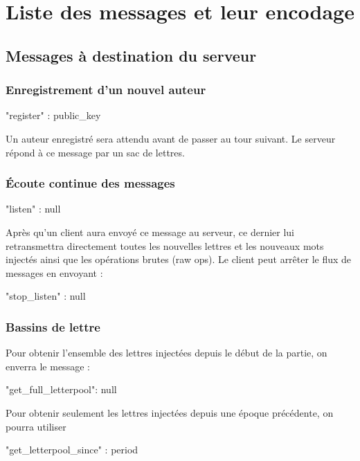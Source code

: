 \documentclass{article}
\begin{document}
\section{Liste des messages et leur encodage}
\label{sec:liste-des-messages}

\subsection{Messages à destination du serveur}
\label{sec:mess-vers-serv}

\subsubsection{Enregistrement d'un nouvel auteur}
\label{sec:register}

\begin{jsonMessage}
  { "register" : public_key }
\end{jsonMessage}
Un auteur enregistré sera attendu avant de passer au tour suivant. Le
serveur répond à ce message par un sac de lettres.

\subsubsection{Écoute continue des messages}
\label{sec:ecoute-continue}
\begin{jsonMessage}
  { "listen" : null }
\end{jsonMessage}
Après qu'un client aura envoyé ce message au serveur, ce dernier lui
retransmettra directement toutes les nouvelles lettres et les nouveaux
mots injectés ainsi que les opérations brutes (raw ops).  Le client
peut arrêter le flux de messages en envoyant :
\begin{jsonMessage}
  { "stop_listen" : null }
\end{jsonMessage}

\subsubsection{Bassins de lettre}
\label{sec:bassins-de-lettre}
Pour obtenir l'ensemble des lettres injectées depuis le début de la
partie, on enverra le message :
\begin{jsonMessage}
  { "get_full_letterpool": null}
\end{jsonMessage}
Pour obtenir seulement les lettres injectées depuis une époque
précédente, on pourra utiliser
\begin{jsonMessage}
  { "get_letterpool_since" : period }
\end{jsonMessage}
\end{document}
